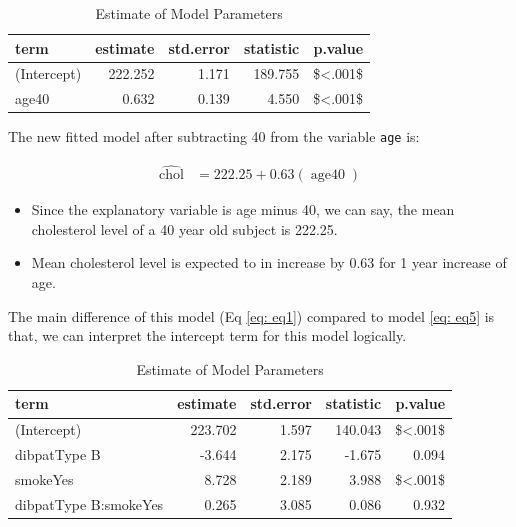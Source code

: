 \documentclass[
  12pt,
  oneside]{article}
\providecommand{\tightlist}{%
  \setlength{\itemsep}{0pt}\setlength{\parskip}{0pt}}
\begin{document}
\begin{table}[H]

\caption{\label{tab:Table-10}Estimate of Model Parameters}
\centering
\begin{tabular}[t]{lrrrr}
\toprule
term & estimate & std.error & statistic & p.value\\
\midrule
(Intercept) & 222.252 & 1.171 & 189.755 & \$<.001\$\\
age40 & 0.632 & 0.139 & 4.550 & \$<.001\$\\
\bottomrule
\end{tabular}
\end{table}

The new fitted model after subtracting 40 from the variable \texttt{age} is:

\begin{equation}
\label{eq: eq5}
\begin{aligned}
\operatorname{\widehat{chol}} &= 222.25 + 0.63(\operatorname{age40})
\end{aligned}
\end{equation}

\begin{itemize}
\tightlist
\item
  Since the explanatory variable is age minus 40, we can say, the mean cholesterol level of a 40 year old subject is 222.25.
\item
  Mean cholesterol level is expected to in increase by 0.63 for 1 year increase of age.
\end{itemize}

The main difference of this model (Eq \ref{eq: eq1}) compared to model \ref{eq: eq5} is that, we can interpret the intercept term for this model logically.

\begin{table}[H]

\caption{\label{tab:Table-11}Estimate of Model Parameters}
\centering
\begin{tabular}[t]{lrrrr}
\toprule
term & estimate & std.error & statistic & p.value\\
\midrule
(Intercept) & 223.702 & 1.597 & 140.043 & \$<.001\$\\
dibpatType B & -3.644 & 2.175 & -1.675 & 0.094\\
smokeYes & 8.728 & 2.189 & 3.988 & \$<.001\$\\
dibpatType B:smokeYes & 0.265 & 3.085 & 0.086 & 0.932\\
\bottomrule
\end{tabular}
\end{table}
\end{document}
